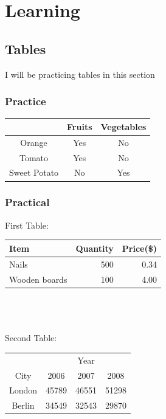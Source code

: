 \documentclass[a4paper,11pt]{report}
\begin{document}
\chapter{Learning}
\section{Tables}
I will be practicing tables in this section
\subsection{Practice}
\begin{tabular}{|c|c|c|} 
\hline
 &Fruits & Vegetables\\
 \hline
 Orange & Yes & No\\
 \hline
 Tomato & Yes & No\\
 \hline
 Sweet Potato & No & Yes\\
 \hline
 \end{tabular}
 \subsection{Practical}
 
 First Table:\\ 
 
 \begin{tabular}{l|r|r}
 Item&Quantity&Price(\$)\\
 \hline
 Nails&500&0.34\\
 
 Wooden boards&100&4.00\\
 
 \end{tabular}\\
 \\
 \\
 Second Table:\\
 
 \begin{tabular}{c|ccc}
 &&Year&\\
 \cline{2-4}
 City&2006&2007&2008\\
 \hline
 London&45789&46551&51298\\
 Berlin&34549&32543&29870\\
 \end{tabular}
  \pagebreak
  
\end{document}
